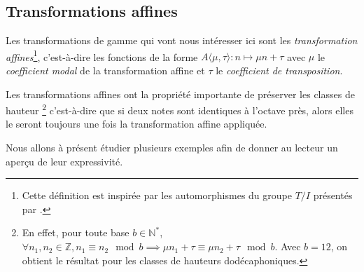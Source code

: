 \subsection{Transformations affines}

Les transformations de gamme qui vont nous intéresser ici sont les \emph{transformation affines}\footnote{Cette définition est inspirée par les automorphismes du groupe $T/I$ présentés par \textcite{lewin1990klumpenhouwer}.}, c'est-à-dire les fonctions de la forme $A\langle\mu,\tau\rangle : n \mapsto \mu n + \tau$ avec $\mu$ le \emph{coefficient modal} de la transformation affine et $\tau$ le \emph{coefficient de transposition}. 

Les transformations affines ont la propriété importante de préserver les classes de hauteur \footnote{En effet, pour toute base $b\in \mathbb{N}^*$, $\forall n_1,n_2 \in \mathbb{Z}, n_1 \equiv n_2 \mod b \implies \mu n_1 + \tau \equiv \mu n_2 + \tau \mod b$. Avec $b=12$, on obtient le résultat pour les classes de hauteurs dodécaphoniques. } c'est-à-dire que si deux notes sont identiques à l'octave près, alors elles le seront toujours une fois la transformation affine appliquée. 

Nous allons à présent étudier plusieurs exemples afin de donner au lecteur un aperçu de leur expressivité.